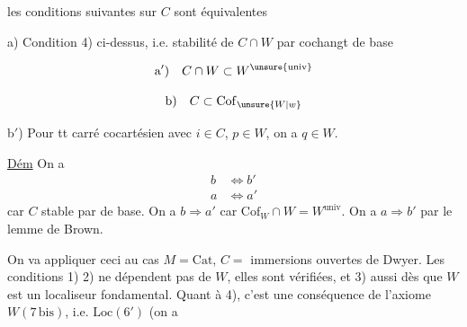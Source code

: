 

les conditions suivantes sur $C$ sont équivalentes

a) Condition 4) ci-dessus, i.e. stabilité de $C\cap W$ par cochangt de base

\[
\text{a$'$)}\quad C\cap W\subset W^{\unsure{\mathrm{univ}}}
\]

\[
\text{b)}\quad C\subset\mathrm{Cof}_{\unsure{W|w}}
\]

b$'$) Pour tt carré cocartésien
avec $i\in C$, $p\in W$, on a $q\in W$.

\uline{Dém} \qquad On a
\[
\begin{aligned}
b&\Longleftrightarrow b'\\
a&\Longleftrightarrow a'
\end{aligned}
\]
car $C$ stable par  de base. On a $b\Longrightarrow a'$ car $\mathrm{Cof}_W\cap W=W^{\mathrm{univ}}$.  On a $a\Longrightarrow b'$ par le lemme de Brown.

On va appliquer ceci au cas $M=\mathrm{Cat}$, $C=$ immersions ouvertes de Dwyer. Les conditions 1) 2) ne dépendent pas de $W$, elles sont vérifiées, et 3) aussi dès que $W$ est un localiseur fondamental. Quant à 4), c'est une conséquence de l'axiome $W(7\,\mathrm{bis})$, i.e. $\mathrm{Loc}(6')$ (on a
